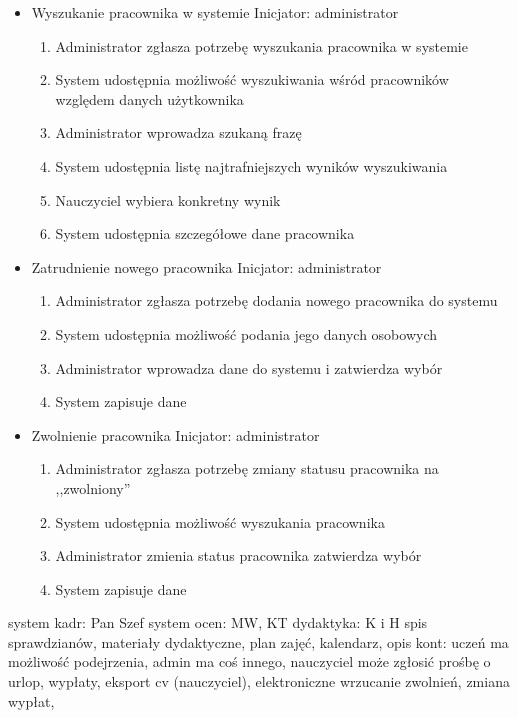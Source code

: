 \documentclass{article}
\begin{document}
\begin{itemize}
\item Wyszukanie pracownika w systemie
Inicjator: administrator
\begin{enumerate}
    \item Administrator zgłasza potrzebę wyszukania pracownika w systemie
    \item System udostępnia możliwość wyszukiwania wśród pracowników względem danych użytkownika
    \item Administrator wprowadza szukaną frazę
    \item System udostępnia listę najtrafniejszych wyników wyszukiwania
    \item Nauczyciel wybiera konkretny wynik
    \item System udostępnia szczegółowe dane pracownika
\end{enumerate}

\item Zatrudnienie nowego pracownika
Inicjator: administrator
\begin{enumerate}
    \item Administrator zgłasza potrzebę dodania nowego pracownika do systemu
    \item System udostępnia możliwość podania jego danych osobowych
    \item Administrator wprowadza dane do systemu i zatwierdza wybór
    \item System zapisuje dane
\end{enumerate}
\item Zwolnienie pracownika
Inicjator: administrator
\begin{enumerate}
    \item Administrator zgłasza potrzebę zmiany statusu pracownika na ,,zwolniony''
    \item System udostępnia możliwość wyszukania pracownika
    \item Administrator zmienia status pracownika zatwierdza wybór
    \item System zapisuje dane
\end{enumerate}
\end{itemize}









system kadr: Pan Szef
system ocen: MW, KT
dydaktyka: K i H spis sprawdzianów, materiały dydaktyczne, plan zajęć, kalendarz, opis kont: uczeń ma możliwość podejrzenia, admin ma coś innego, nauczyciel może zgłosić prośbę o urlop, wypłaty, eksport cv (nauczyciel), elektroniczne wrzucanie zwolnień, zmiana wypłat,
\end{document}

